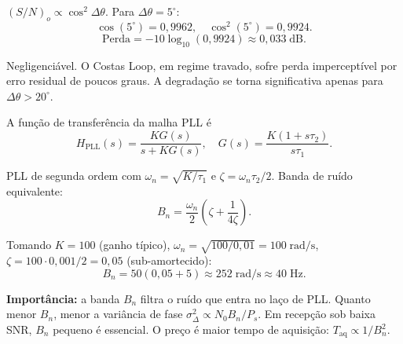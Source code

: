 \documentclass[11pt,a4paper]{article}
\begin{document}
\begin{resolucao}

$(S/N)_o \propto \cos^2\Delta\theta$. Para $\Delta\theta = 5^\circ$:
\[
  \cos(5^\circ) = 0{,}9962, \quad \cos^2(5^\circ) = 0{,}9924.
\]
\[
  \boxed{\text{Perda} = -10\log_{10}(0{,}9924) \approx 0{,}033\;\text{dB}.}
\]

Negligenciável. O Costas Loop, em regime travado, sofre perda imperceptível por erro residual de poucos graus. A degradação se torna significativa apenas para $\Delta\theta > 20^\circ$.
\end{resolucao}

\begin{resolucao}

A função de transferência da malha PLL é
\[
  H_{\text{PLL}}(s) = \frac{K G(s)}{s + K G(s)}, \quad G(s) = \frac{K(1 + s\tau_2)}{s\tau_1}.
\]

PLL de segunda ordem com $\omega_n = \sqrt{K/\tau_1}$ e $\zeta = \omega_n\tau_2/2$. Banda de ruído equivalente:
\[
  B_n = \frac{\omega_n}{2}\left(\zeta + \frac{1}{4\zeta}\right).
\]

Tomando $K = 100$ (ganho típico), $\omega_n = \sqrt{100/0{,}01} = 100\;\text{rad/s}$, $\zeta = 100 \cdot 0{,}001/2 = 0{,}05$ (sub-amortecido):
\[
  B_n = 50(0{,}05 + 5) \approx 252\;\text{rad/s} \approx 40\;\text{Hz}.
\]

\textbf{Importância:} a banda $B_n$ filtra o ruído que entra no laço de PLL. Quanto menor $B_n$, menor a variância de fase $\sigma_\Delta^2 \propto N_0 B_n/P_s$. Em recepção sob baixa SNR, $B_n$ pequeno é essencial. O preço é maior tempo de aquisição: $T_{\text{aq}} \propto 1/B_n^2$.
\end{resolucao}
\end{document}
